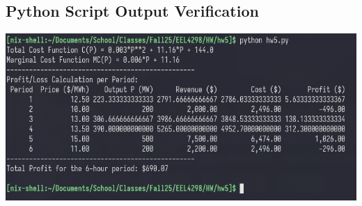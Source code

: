 \documentclass{article}
\begin{document}
\subsection{Python Script Output Verification}
\includegraphics[width=\textwidth]{apple.png}
\end{document}
